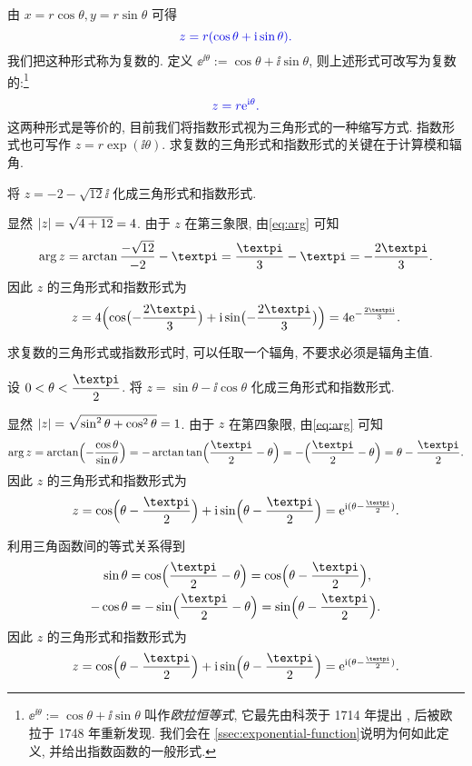 由 $x=r\cos\theta,y=r\sin\theta$ 可得
\[
  \color{main}z=r(\cos\theta+\ii\sin\theta).
\]
我们把这种形式称为复数的.
定义 \alert{$\ee^{\ii\theta}:=\cos\theta+\ii\sin\theta$}, 则上述形式可改写为复数的:\footnote{%
  $\ee^{\ii\theta}:=\cos\theta+\ii\sin\theta$ 叫作\emph{欧拉恒等式}, 它最先由科茨于 1714 年提出 \cite[第19章3节]{Kline1990b}, 后被欧拉于 1748 年重新发现.
  我们会在 \ref{ssec:exponential-function}说明为何如此定义, 并给出指数函数的一般形式.
}
\[
  \color{main}z=r\ee^{\ii\theta}.
\]
这两种形式是等价的, 目前我们将指数形式视为三角形式的一种缩写方式.
指数形式也可写作 $z=r\exp(\ii\theta)$.
求复数的三角形式和指数形式的\alert{关键在于计算模和辐角}.

\begin{example}
  将 $z=-2-\sqrt{12}\ii$ 化成三角形式和指数形式.
\end{example}

\begin{solution}
  显然 $\lvert z\rvert=\sqrt{4+12}=4$.
  由于 $z$ 在第三象限, 由\eqref{eq:arg} 可知
  \[
     \arg z
    =\arctan\frac{-\sqrt{12}}{-2}-\cpi
    =\frac\cpi3-\cpi
    =-\frac{2\cpi}3.
  \]
  因此 $z$ 的三角形式和指数形式为
  \[
     z
    =4\Bigl(\cos\bigl(-\frac{2\cpi}3\bigr)+\ii\sin\bigl(-\frac{2\cpi}3\bigr)\Bigr)
    =4\ee^{-\frac{2\cpi \ii}3}.
  \]
\end{solution}

求复数的三角形式或指数形式时, 可以任取一个辐角, 不要求必须是辐角主值.

\begin{example}
  设 $0<\theta<\dfrac\cpi2$.
  将 $z=\sin\theta-\ii\cos\theta$ 化成三角形式和指数形式.
\end{example}

\begin{solution}[解法一]
  显然 $\lvert z\rvert=\sqrt{\sin^2\theta+\cos^2\theta}=1$. 由于 $z$ 在第四象限, 由\eqref{eq:arg} 可知
  \[
     \arg z
    =\arctan\Bigl(-\frac{\cos\theta}{\sin\theta}\Bigr)
    =-\arctan\tan\Bigl(\frac\cpi2-\theta\Bigr)
    =-\Bigl(\frac\cpi2-\theta\Bigr)
    =\theta-\frac\cpi2.
  \]
  因此 $z$ 的三角形式和指数形式为
  \[
     z
    =\cos\Bigl(\theta-\frac\cpi2\Bigr)+\ii\sin\Bigl(\theta-\frac\cpi2\Bigr)
    =\ee^{\ii(\theta-\frac\cpi2)}.
  \]
\end{solution}

\begin{solution}[解法二]
  利用三角函数间的等式关系得到
  \begin{align*}
      \sin\theta
    &=\cos\Bigl(\frac\cpi2-\theta\Bigr)
     =\cos\Bigl(\theta-\frac\cpi2\Bigr),\\
      -\cos\theta
    &=-\sin\Bigl(\frac\cpi2-\theta\Bigr)
     =\sin\Bigl(\theta-\frac\cpi2\Bigr).
  \end{align*}
  因此 $z$ 的三角形式和指数形式为
  \[
     z
    =\cos\Bigl(\theta-\frac\cpi2\Bigr)+\ii\sin\Bigl(\theta-\frac\cpi2\Bigr)
    =\ee^{\ii(\theta-\frac\cpi2)}.
  \]
\end{solution}

